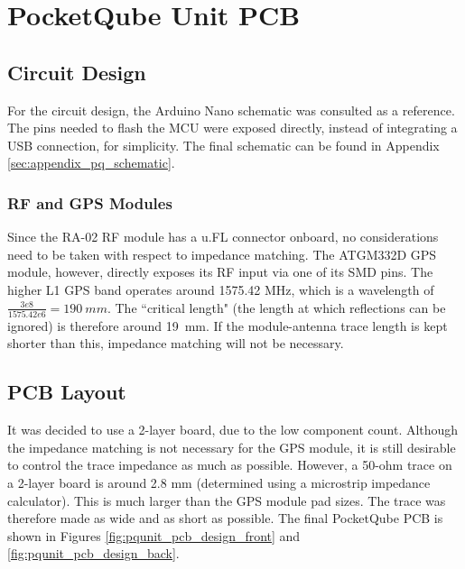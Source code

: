 \section{PocketQube Unit PCB}
\subsection{Circuit Design}
For the circuit design, the Arduino Nano schematic \cite{design-arduinoNano} was consulted as a reference. The pins needed to flash the MCU were exposed directly, instead of integrating a USB connection, for simplicity. The final schematic can be found in Appendix \ref{sec:appendix_pq_schematic}.

\subsubsection{RF and GPS Modules}
Since the RA-02 RF module has a u.FL connector onboard, no considerations need to be taken with respect to impedance matching. The ATGM332D GPS module, however, directly exposes its RF input via one of its SMD pins. The higher L1 GPS band operates around 1575.42 MHz, which is a wavelength of $\frac{3e8}{1575.42e6} = \SI{190}{mm}$. The ``critical length" (the length at which reflections can be ignored) is therefore around \SI{19}{mm}. If the module-antenna trace length is kept shorter than this, impedance matching will not be necessary.

\subsection{PCB Layout}
It was decided to use a 2-layer board, due to the low component count. Although the impedance matching is not necessary for the GPS module, it is still desirable to control the trace impedance as much as possible. However, a 50-ohm trace on a 2-layer board is around 2.8 mm (determined using a microstrip impedance calculator). This is much larger than the GPS module pad sizes. The trace was therefore made as wide and as short as possible. The final PocketQube PCB is shown in Figures \ref{fig:pqunit_pcb_design_front} and \ref{fig:pqunit_pcb_design_back}.